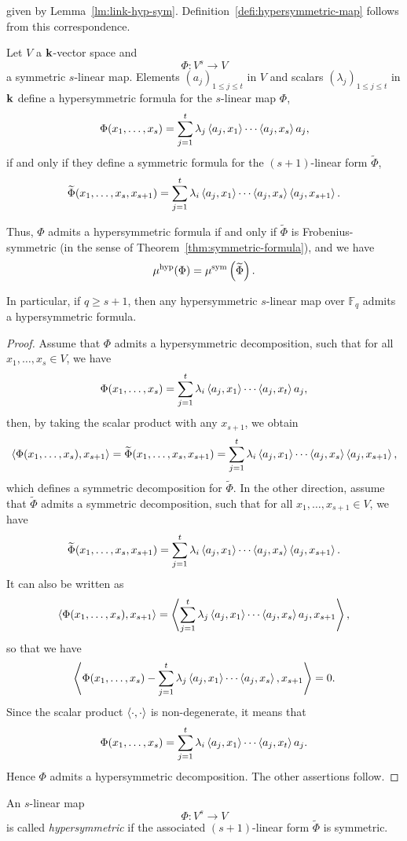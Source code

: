 given by Lemma~\ref{lm:link-hyp-sym}.
Definition~\ref{defi:hypersymmetric-map} follows from this correspondence.
\begin{lm}
  \label{lm:link-hyp-sym}
  Let $V$ a $\mathbf{k}$-vector space and 
  \[
    \Phi:V^s\to V
  \]
  a symmetric $s$-linear map. 
Elements $(a_j)_{1\leq j\leq t}$ in $V$ and scalars $(\lambda_j)_{1\leq j\leq
t}$ in $\mathbf{k}$ define a hypersymmetric formula for the $s$-linear map $\Phi$,
\[
\Phi(x_1,\dots,x_s)=\sum_{j=1}^{t}\lambda_j\left\langle a_j,x_1\right\rangle\cdots\left\langle a_j,x_s\right\rangle a_j,
\]
if and only if they define a symmetric formula for the $(s+1)$-linear form $\widetilde{\Phi}$,
\[
\widetilde{\Phi}(x_1,\dots,x_s,x_{s+1})=\sum_{j=1}^{t}\lambda_i\left\langle a_j,x_1\right\rangle\cdots\left\langle a_j,x_s\right\rangle\left\langle a_j,x_{s+1}\right\rangle.
\]

Thus, $\Phi$ admits a hypersymmetric formula if and only if $\widetilde{\Phi}$ is Frobenius-symmetric (in the sense of Theorem~\ref{thm:symmetric-formula}),
and we have
\[
\mu^{\textrm{hyp}}(\Phi)=\mu^{\textrm{sym}}\left(\widetilde{\Phi}\right).
\]

In particular, if $q\geq s+1$, then any hypersymmetric $s$-linear map over $\mathbb{F}_q$ admits a hypersymmetric formula.
\end{lm}
\begin{proof}
  Assume that $\Phi$ admits a hypersymmetric decomposition, such that for all
  $x_1, \dots, x_s\in V$, we have
  \[
    \Phi(x_1,\dots,x_s)=\sum_{j=1}^{t}\lambda_i\left\langle a_j,x_1\right\rangle\cdots\left\langle a_j,x_t\right\rangle a_j,
  \]
  then, by taking the scalar product with any $x_{s+1}$, we obtain
\[
  \left\langle\Phi(x_1, \dots,
  x_s),x_{s+1}\right\rangle=\widetilde{\Phi}(x_1,\dots,x_s,x_{s+1})=\sum_{j=1}^{t}\lambda_i\left\langle a_j,x_1\right\rangle\cdots\left\langle a_j,x_s\right\rangle\left\langle a_j,x_{s+1}\right\rangle,
\]
which defines a symmetric decomposition for $\widetilde\Phi$. In the other
direction, assume that $\widetilde\Phi$ admits a symmetric decomposition, such
that for all $x_1, \dots, x_{s+1}\in V$, we have
\[
\widetilde{\Phi}(x_1,\dots,x_s,x_{s+1})=\sum_{j=1}^{t}\lambda_i\left\langle a_j,x_1\right\rangle\cdots\left\langle a_j,x_s\right\rangle\left\langle a_j,x_{s+1}\right\rangle.
\]
It can also be written as
\[
  \left\langle\Phi(x_1, \dots,
  x_s),x_{s+1}\right\rangle=\left\langle\sum_{j=1}^t\lambda_j\left\langle a_j,x_1\right\rangle\cdots\left\langle a_j,x_s\right\rangle a_j,x_{s+1}\right\rangle,
\]
so that we have
\[
  \left\langle\Phi(x_1, \dots,
  x_s)-\sum_{j=1}^t\lambda_j\left\langle a_j,x_1\right\rangle\cdots\left\langle a_j,x_s\right\rangle,x_{s+1}\right\rangle=0.
\]
Since the scalar product $\left\langle\cdot,\cdot\right\rangle$ is non-degenerate, it means that
  \[
    \Phi(x_1,\dots,x_s)=\sum_{j=1}^{t}\lambda_i\left\langle a_j,x_1\right\rangle\cdots\left\langle a_j,x_t\right\rangle a_j.
  \]
  Hence $\Phi$ admits a hypersymmetric decomposition. The other assertions
  follow.
\end{proof}
\begin{defi}
  \label{defi:hypersymmetric-map}
  An $s$-linear map 
  \[
    \Phi:V^s\to V
  \]
  is called \emph{hypersymmetric} if the associated $(s+1)$-linear
  form $\widetilde\Phi$ is symmetric.
\end{defi}

